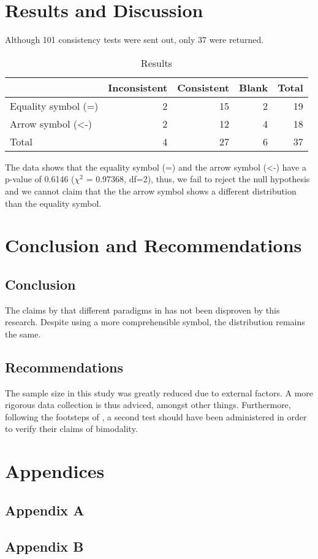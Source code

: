 \documentclass[12pt]{article}
\begin{document}
\section{Results and Discussion}
\label{sec:org474ced4}
Although 101 consistency tests were sent out, only 37 were returned.

\begin{table}[htbp]
\caption{\label{tab:org7c74a6f}
Results}
\centering
\begin{tabular}{lrrrr}
 & Inconsistent & Consistent & Blank & Total\\
\hline
Equality symbol (=) & 2 & 15 & 2 & 19\\
Arrow symbol (<-) & 2 & 12 & 4 & 18\\
Total & 4 & 27 & 6 & 37\\
\end{tabular}
\end{table}

The data shows that the equality symbol (=) and the arrow symbol (<-) have a p-value of 0.6146 (\(\chi^{\text{2}}\) = 0.97368,  df=2),
thus, we fail to reject the null hypothesis and
we cannot claim that the the arrow symbol shows a different distribution than the equality symbol.

\section{Conclusion and Recommendations}
\label{sec:org90c0c9d}

\subsection{Conclusion}
\label{sec:orgc3a0278}
The claims by \cite{dehnadi2006camel} that different paradigms in has not been disproven by this research.
Despite using a more comprehensible symbol, the distribution remains the same.

\subsection{Recommendations}
\label{sec:org5bd515e}
The sample size in this study was greatly reduced due to external factors. 
A more rigorous data collection is thus adviced, amongst other things.
Furthermore, following the footsteps of \cite{dehnadi2006camel}, 
a second test should have been administered in order to 
verify their claims of bimodality.

\raggedright



\section{Appendices}
\label{sec:orgb5d6273}
\subsection{Appendix A}
\label{sec:orgf107c97}


\subsection{Appendix B}
\label{sec:orgc1ee00a}

\end{document}

